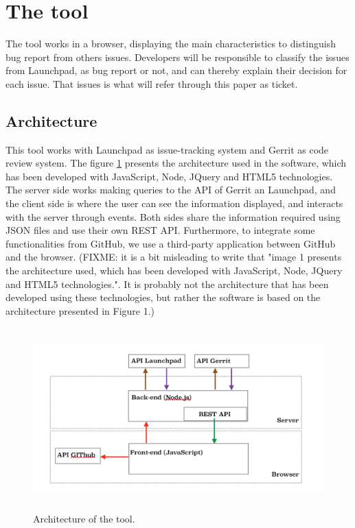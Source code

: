 \documentclass[runningheads,a4paper]{llncs}
\begin{document}
\section{The tool}
\label{sec:2}

The tool works in a browser, displaying the main characteristics to distinguish bug report from others issues. Developers will be responsible to classify the issues from Launchpad, as bug report or not, and can thereby explain their decision for each issue. That issues is what will refer through this paper as ticket.


\subsection{Architecture}

This tool works with Launchpad as issue-tracking system and Gerrit as code review system. The figure \ref{fig:1} presents the architecture used in the software, which has been developed with JavaScript, Node, JQuery and HTML5 technologies. The server side works making queries to the API of Gerrit an Launchpad, and the client side is where the user can see the information displayed, and interacts with the server through events. Both sides share the information required using JSON files and use their own REST API. Furthermore, to integrate some functionalities from GitHub, we use a third-party application between GitHub and the browser. (FIXME: it is a bit misleading to write that "image 1 presents the architecture used, which has been developed with JavaScript, Node, JQuery and HTML5 technologies.". It is probably not the architecture that has been developed using these technologies, but rather the software is based on the architecture presented in Figure 1.)

\label{sec:2.1}
\begin{figure}
\centering
\includegraphics[height=7cm]{Arquitectura.png}
\caption{Architecture of the tool.}
\label{fig:1}       %
\end{figure}
\end{document}
